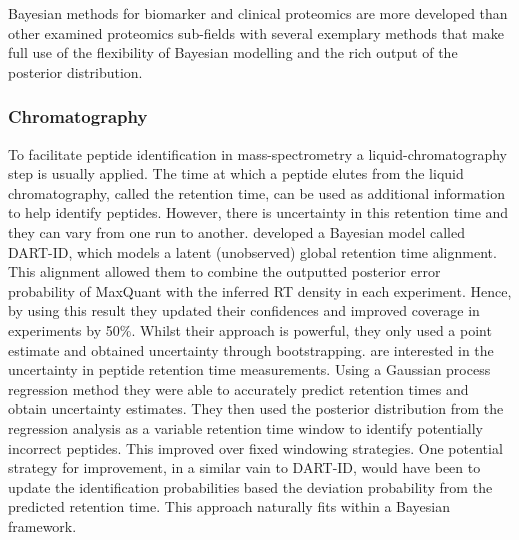 \documentclass[12pt,english, journal=jpr, layout=twocolumn]{article}
\begin{document}
Bayesian methods for biomarker and clinical proteomics are more developed than other examined proteomics sub-fields with several exemplary methods that make full use of the flexibility of Bayesian modelling and the rich output of the posterior distribution. 
\subsubsection{Chromatography}
To facilitate peptide identification in mass-spectrometry a liquid-chromatography step is usually applied. The time at which a peptide elutes from the liquid chromatography, called the retention time, can be used as additional information to help identify peptides. However, there is uncertainty in this retention time and they can vary from one run to another. \citet{Chen::2019} developed a Bayesian model called DART-ID, which models a latent (unobserved) global retention time alignment. This alignment allowed them to combine the outputted posterior error probability of MaxQuant with the inferred RT density in each experiment. Hence, by using this result they updated their confidences and improved coverage in experiments by 50$\%$. Whilst their approach is powerful, they only used a point estimate and obtained uncertainty through bootstrapping. \citet{Maboudi::2017} are interested in the uncertainty in peptide retention time measurements. Using a Gaussian process regression method they were able to accurately predict retention times and obtain uncertainty estimates. They then used the posterior distribution from the regression analysis as a variable retention time window to identify potentially incorrect peptides. This improved over fixed windowing strategies. One potential strategy for improvement, in a similar vain to DART-ID, would have been to update the identification probabilities based the deviation probability from the predicted retention time. This approach naturally fits within a Bayesian framework. 
\end{document}
